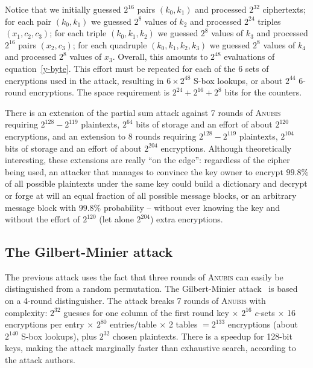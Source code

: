\documentclass{llncs}
\begin{document}
Notice that we initially guessed $2^{16}$ pairs $(k_0, k_1)$ and
processed $2^{32}$ ciphertexts; for each pair $(k_0, k_1)$ we
guessed $2^8$ values of $k_2$ and processed $2^{24}$ triples
$(x_1, c_2, c_3)$; for each triple $(k_0, k_1, k_2)$ we guessed
$2^8$ values of $k_3$ and processed $2^{16}$ pairs $(x_2, c_3)$;
for each quadruple $(k_0, k_1, k_2, k_3)$ we guessed $2^8$ values
of $k_4$ and processed $2^8$ values of $x_3$. Overall, this
amounts to $2^{48}$ evaluations of equation~\ref{y-byte}. This
effort must be repeated for each of the 6 sets of encryptions used
in the attack, resulting in $6 \times 2^{48}$ S-box lookups, or
about $2^{44}$ 6-round encryptions. The space requirement is
$2^{24} + 2^{16} + 2^{8}$ bits for the counters.

There is an extension of the partial sum attack against 7 rounds
of \textsc{Anubis}~\cite{partial-sum} requiring $2^{128} -
2^{119}$ plaintexts, $2^{64}$ bits of storage and an effort of
about $2^{120}$ encryptions, and an extension to 8 rounds
requiring $2^{128} - 2^{119}$ plaintexts, $2^{104}$ bits of
storage and an effort of about $2^{204}$ encryptions. Although
theoretically interesting, these extensions are really ``on the
edge'': regardless of the cipher being used, an attacker that
manages to convince the key owner to encrypt $99.8\%$ of all
possible plaintexts under the same key could build a dictionary
and decrypt or forge at will an equal fraction of all possible
message blocks, or an arbitrary message block with $99.8\%$ probability --
without ever knowing the key and without the effort of $2^{120}$
(let alone $2^{204}$) extra encryptions.

\subsection{The Gilbert-Minier attack}

The previous attack uses the fact that three rounds of
\textsc{Anubis} can easily be distinguished from a random
permutation. The Gilbert-Minier attack~\cite{gilbert-minier} is
based on a 4-round distinguisher. The attack breaks 7 rounds of
\textsc{Anubis} with complexity: $2^{32}$ guesses for one column
of the first round key $\times$ $2^{16}$ $c$-sets $\times$ 16
encryptions per entry $\times$ $2^{80}$ entries/table $\times$ 2
tables $= 2^{133}$ encryptions (about $2^{140}$ S-box lookups),
plus $2^{32}$ chosen plaintexts. There is a speedup for 128-bit
keys, making the attack marginally faster than exhaustive search,
according to the attack authors.
\end{document}
